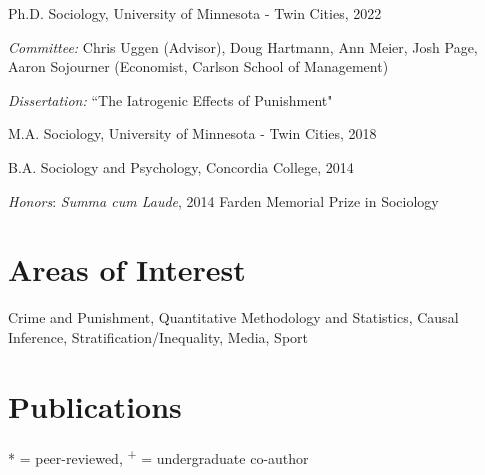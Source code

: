 \documentclass[letterpaper]{article}
\renewenvironment{itemize}{
  \begin{list}{}{
    \setlength{\leftmargin}{1.5em}
  }
}{
  \end{list}
}
\begin{document}
\begin{itemize}
  \item Ph.D. Sociology, University of Minnesota - Twin Cities, 2022
   \begin{itemize}
	\item \textit{Committee:} Chris Uggen (Advisor),  Doug Hartmann, Ann Meier, Josh Page, Aaron Sojourner (Economist, Carlson School of Management)
           \item \textit{Dissertation:} ``The Iatrogenic Effects of Punishment"
\end{itemize}
    
\item M.A. Sociology, University of Minnesota - Twin Cities, 2018

 \item B.A. Sociology and Psychology, Concordia College, 2014
 \begin{itemize}
     \item \textit{Honors}: \textit{Summa cum Laude}, 2014 Farden Memorial Prize in Sociology
    \end{itemize}
\end{itemize}

\section*{\textbf{Areas of Interest}}

Crime and Punishment, Quantitative Methodology and Statistics, Causal Inference, Stratification/Inequality, Media, Sport


\section*{\textbf{Publications}} * = peer-reviewed, \textsuperscript{+} = undergraduate co-author
\end{document}
